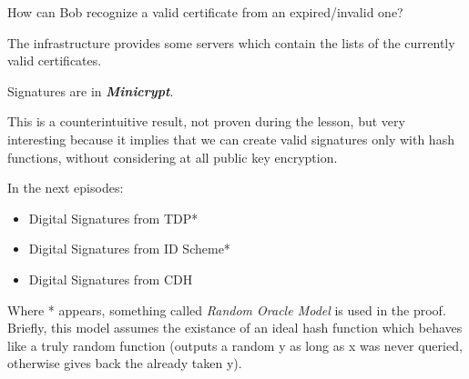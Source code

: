 How can Bob recognize a valid certificate from an expired/invalid one?

The infrastructure provides some servers which contain the lists of the currently valid certificates.

\begin{theorem}
    Signatures are in \textit{\textbf{Minicrypt}}.
\end{theorem}

This is a counterintuitive result, not proven during the lesson, but very interesting because it implies that we can create valid signatures only with hash functions, without considering at all public key encryption.


In the next episodes:
\begin{itemize}
    \item Digital Signatures from TDP*
    \item Digital Signatures from ID Scheme*
    \item Digital Signatures from CDH
\end{itemize}

Where * appears, something called \textit{Random Oracle Model} is used in the proof. Briefly, this model assumes the existance of an ideal hash function which behaves like a truly random function (outputs a random y as long as x was never queried, otherwise gives back the already taken y).
